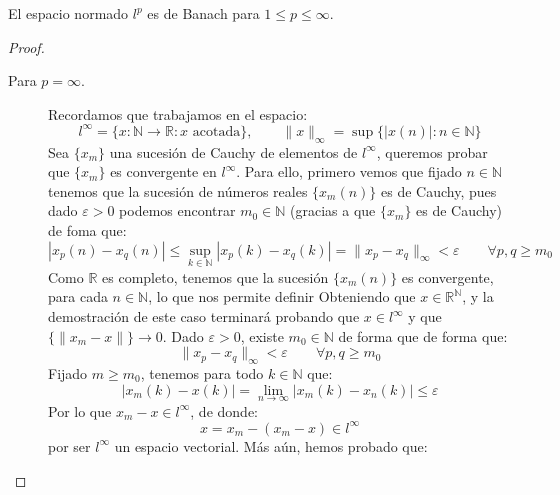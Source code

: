 \begin{prop}
    El espacio normado $l^p$ es de Banach para $1\leq p \leq \infty$.
    \begin{proof}
        \begin{description}
            \item [Para $p=\infty$.] Recordamos que trabajamos en el espacio:
                \begin{equation*}
                    l^\infty = \{x:\mathbb{N}\to\mathbb{R} : x \text{\ acotada}\}, \qquad \|x\|_\infty = \sup\{|x(n)|: n\in \mathbb{N}\}
                \end{equation*}
                Sea $\{x_m\}$ una sucesión de Cauchy de elementos de $l^\infty$, queremos probar que $\{x_m\}$ es convergente en $l^\infty$. Para ello, primero vemos que fijado $n\in \mathbb{N}$ tenemos que la sucesión de números reales $\{x_m(n)\}$ es de Cauchy, pues dado $\varepsilon>0$ podemos encontrar $m_0\in \mathbb{N}$ (gracias a que $\{x_m\}$ es de Cauchy) de foma que:
                \begin{equation*}
                    |x_p(n) - x_q(n)| \leq \sup_{k \in \mathbb{N}}|x_p(k)-x_q(k)| = \|x_p-x_q\|_\infty < \varepsilon \qquad \forall p,q\geq m_0
                \end{equation*}
                Como $\mathbb{R}$ es completo, tenemos que la sucesión $\{x_m(n)\}$ es convergente, para cada $n\in \mathbb{N}$, lo que nos permite definir
                Obteniendo que $x\in \mathbb{R}^\mathbb{N}$, y la demostración de este caso terminará probando que $x\in l^\infty$ y que $\{\|x_m - x\|\}\to 0$. Dado $\varepsilon>0$, existe $m_0\in \mathbb{N}$ de forma que de forma que:
                \begin{equation*}
                    \|x_p - x_q\|_\infty < \varepsilon\qquad \forall p,q\geq m_0
                \end{equation*}
                Fijado $m\geq m_0$, tenemos para todo $k\in \mathbb{N}$ que:
                \begin{equation*}
                    |x_m(k)- x(k)| = \lim_{n\to\infty}|x_m(k) - x_n(k)| \leq \varepsilon 
                \end{equation*}
                Por lo que $x_m-x\in l^\infty$, de donde:
                \begin{equation*}
                    x = x_m -(x_m - x) \in l^\infty
                \end{equation*}
                por ser $l^\infty$ un espacio vectorial. Más aún, hemos probado que:

\end{description}
\end{proof}
\end{prop}
